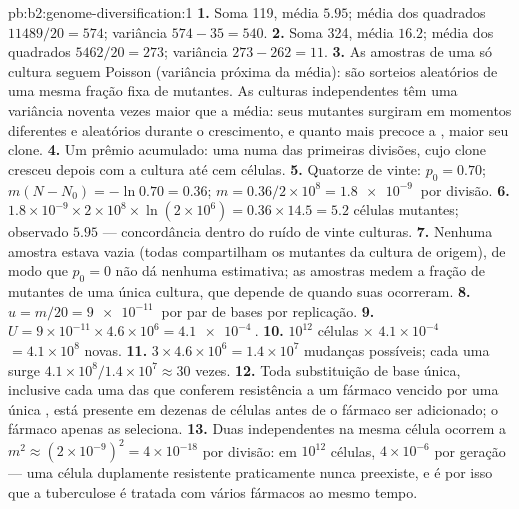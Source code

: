 \begin{solution}{pb:b2:genome-diversification:1}
\textbf{1.} Soma 119, média $5.95$; média dos quadrados $11489/20 = 574$;
variância $574 - 35 = 540$.
\textbf{2.} Soma 324, média $16.2$; média dos quadrados $5462/20 = 273$;
variância $273 - 262 = 11$.
\textbf{3.} As amostras de uma só cultura seguem Poisson (variância
próxima da média): são sorteios aleatórios de uma mesma fração fixa de
mutantes. As culturas independentes têm uma variância noventa vezes
maior que a média: seus mutantes surgiram em momentos diferentes e
aleatórios durante o crescimento, e quanto mais precoce a ,
maior seu clone.
\textbf{4.} Um prêmio acumulado: uma  numa das primeiras
divisões, cujo clone cresceu depois com a cultura até cem células.
\textbf{5.} Quatorze de vinte: $p_0 = 0.70$; $m(N - N_0) = -\ln 0.70
= 0.36$; $m = 0.36/2\times 10^{8} = \qty{1.8e-9}{}$ por divisão.
\textbf{6.} $1.8\times 10^{-9}\times 2\times 10^{8}\times \ln(2\times
10^{6}) = 0.36\times 14.5 = 5.2$ células mutantes; observado $5.95$
--- concordância dentro do ruído de vinte culturas.
\textbf{7.} Nenhuma amostra estava vazia (todas compartilham os
mutantes da cultura de origem), de modo que $p_0 = 0$ não dá nenhuma
estimativa; as amostras medem a fração de mutantes de uma única
cultura, que depende de quando suas  ocorreram.
\textbf{8.} $u = m/20 = \qty{9e-11}{}$ por par de bases por replicação.
\textbf{9.} $U = 9\times 10^{-11}\times 4.6\times 10^{6} =
\qty{4.1e-4}{}$.
\textbf{10.} $10^{12}$ células $\times$ $4.1\times 10^{-4}$ $= 4.1\times
10^{8}$  novas.
\textbf{11.} $3\times 4.6\times 10^{6} = 1.4\times 10^{7}$ mudanças
possíveis; cada uma surge $4.1\times 10^{8}/1.4\times 10^{7} \approx 30$
vezes.
\textbf{12.} Toda substituição de base única, inclusive cada uma das
que conferem resistência a um fármaco vencido por uma única ,
está presente em dezenas de células antes de o fármaco ser adicionado;
o fármaco apenas as seleciona.
\textbf{13.} Duas  independentes na mesma célula ocorrem a
$m^2 \approx (2\times 10^{-9})^2 = 4\times 10^{-18}$ por divisão: em
$10^{12}$ células, $4\times 10^{-6}$ por geração --- uma célula
duplamente resistente praticamente nunca preexiste, e é por isso que
a tuberculose é tratada com vários fármacos ao mesmo tempo.

\end{solution}
